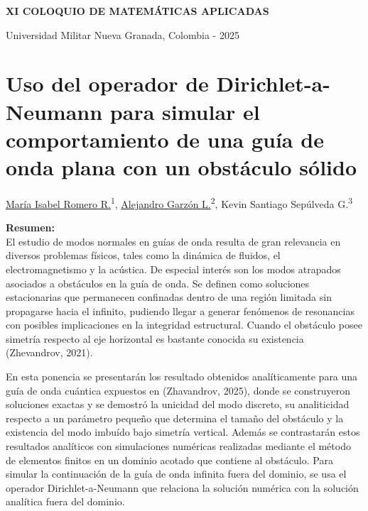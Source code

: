 \documentclass[11pt]{article}
\newcommand{\ponente}[1]{\underline{#1}}
\let\cleardoublepage\clearpage
\begin{document}
\cleardoublepage
\begin{center}
	\textbf{\LARGE{XI COLOQUIO DE MATEM\'ATICAS APLICADAS }}\\
    {\Large Universidad Militar Nueva Granada, Colombia - 2025 \par}
	\vspace{0.4cm}
\end{center}
\section*{Uso del operador de Dirichlet-a-Neumann para simular el comportamiento de una guía de onda plana con un obstáculo sólido}
%
\thispagestyle{plain}
\vspace*{1cm}
\begin{center}
	{\large \ponente{Mar\'ia Isabel Romero R.}\textsuperscript{1}, \ponente{Alejandro Garz\'on L.}\textsuperscript{2}, Kevin Santiago Sep\'ulveda G.\textsuperscript{3}}\\[1em]
\end{center}


\noindent\textbf{Resumen:}\\
El estudio de modos normales en guías de onda resulta de gran relevancia en diversos problemas físicos, tales como la dinámica de fluidos, el electromagnetismo y la acústica. De especial inter\'es son los modos atrapados asociados a obst\'aculos en la guía de onda. Se definen como soluciones estacionarias que permanecen confinadas dentro de una región limitada sin propagarse hacia el infinito, pudiendo llegar a generar fenómenos de resonancias con posibles implicaciones en la integridad estructural. Cuando el obstáculo posee simetría respecto al eje horizontal es bastante conocida su existencia (Zhevandrov, 2021).

En esta ponencia se presentar\'an los resultado obtenidos anal\'iticamente para una guía de onda cuántica expuestos en (Zhavandrov, 2025), donde se construyeron soluciones exactas y se demostró la unicidad del modo discreto, su analiticidad respecto  a un par\'ametro peque\~no que determina el tama\~no del obst\'aculo y la existencia del modo imbuído bajo simetría vertical. Adem\'as se contrastar\'an estos resultados anal\'iticos con simulaciones num\'ericas realizadas mediante el m\'etodo de elementos finitos en un dominio acotado que contiene al obst\'aculo. Para simular la continuaci\'on de la gu\'ia de onda infinita fuera del dominio, se usa el operador Dirichlet-a-Neumann que relaciona la soluci\'on num\'erica con la soluci\'on anal\'itica fuera del dominio.
\end{document}
